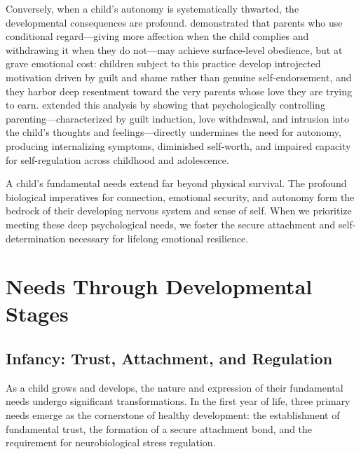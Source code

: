 Conversely, when a child's autonomy is systematically thwarted, the developmental consequences are profound.
\citet{assor2004} demonstrated that parents who use conditional regard---giving more affection when the child complies and withdrawing it when they do not---may achieve surface-level obedience, but at grave emotional cost: children subject to this practice develop introjected motivation driven by guilt and shame rather than genuine self-endorsement, and they harbor deep resentment toward the very parents whose love they are trying to earn.
\citet{soenens2010} extended this analysis by showing that psychologically controlling parenting---characterized by guilt induction, love withdrawal, and intrusion into the child's thoughts and feelings---directly undermines the need for autonomy, producing internalizing symptoms, diminished self-worth, and impaired capacity for self-regulation across childhood and adolescence.

\begin{keyinsight}
A child's fundamental needs extend far beyond physical survival.
The profound biological imperatives for connection, emotional security, and autonomy form the bedrock of their developing nervous system and sense of self.
When we prioritize meeting these deep psychological needs, we foster the secure attachment and self-determination necessary for lifelong emotional resilience.
\end{keyinsight}

\section{Needs Through Developmental Stages}

\subsection{Infancy: Trust, Attachment, and Regulation}

As a child grows and develops, the nature and expression of their fundamental needs undergo significant transformations. 
In the first year of life, three primary needs emerge as the cornerstone of healthy development: the establishment of fundamental trust, the formation of a secure attachment bond, and the requirement for neurobiological stress regulation.

